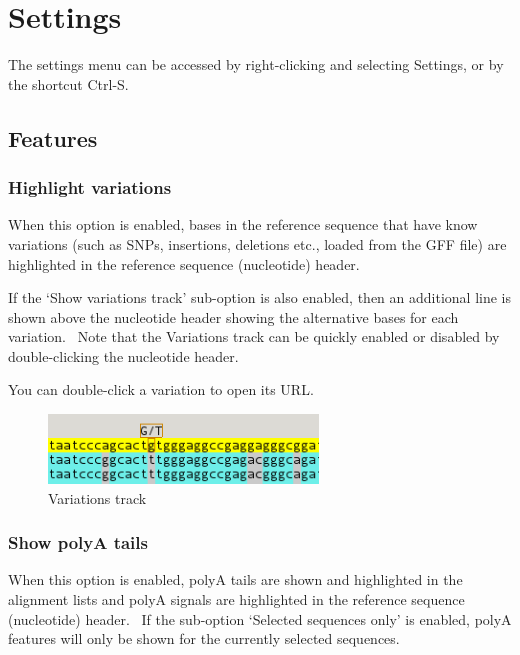 \documentclass[letterpaper]{article}
\begin{document}
\bigskip

{\color[rgb]{0.0,0.27058825,0.5254902}\section[Settings]{Settings}}
\hypertarget{RefHeading2221056909880}{}{
The settings menu can be accessed by right-clicking and selecting
Settings, or by the shortcut Ctrl-S.}

{\color[rgb]{0.30980393,0.5058824,0.7411765}\subsection[Features]{Features}}
\hypertarget{RefHeading2241056909880}{}
{\color[rgb]{0.30980393,0.5058824,0.7411765}\subsubsection[Highlight
variations]{Highlight variations}}
\hypertarget{RefHeading2261056909880}{}{
When this option is enabled, bases in the reference sequence that have
know variations (such as SNPs, insertions, deletions etc., loaded from
the GFF file) are highlighted in the reference sequence (nucleotide)
header.}

{
If the {\textquoteleft}Show variations track{\textquoteright} sub-option
is also enabled, then an additional line is shown above the nucleotide
header showing the alternative bases for each variation. \ Note that
the Variations track can be quickly enabled or disabled by
double-clicking the nucleotide header.}

{
You can double-click a variation to open its URL.}


\bigskip

\begin{figure}
\centering
\color[rgb]{0.30980393,0.5058824,0.7411765}
\includegraphics[width=7.181cm,height=1.852cm]{img_view_variations.png}
\caption{Variations track}
\end{figure}

{\color[rgb]{0.30980393,0.5058824,0.7411765}\subsubsection[Show polyA tails]{Show polyA tails}}
\hypertarget{RefHeading2281056909880}{}{
When this option is enabled, polyA tails are shown and highlighted in
the alignment lists and polyA signals are highlighted in the reference
sequence (nucleotide) header. \ If the sub-option
{\textquoteleft}Selected sequences only{\textquoteright} is enabled,
polyA features will only be shown for the currently selected
sequences.}
\end{document}
